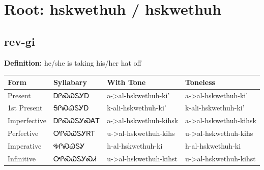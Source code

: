 \documentclass{article}%
\begin{document}
%
\normalsize%
\section*{Root: hskwethuh / hskwethuh}%
\subsection*{rev-gi}%
\textbf{Definition: }%
he/she is taking his/her hat off%
\\[0.5em]%
\begin{tabular}{|l|l|l|l|}%
\hline%
\textbf{Form}&\textbf{Syllabary}&\textbf{With Tone}&\textbf{Toneless}\\%
\hline%
Present&ᎠᎵᏍᏇᏚᎩᎠ&a{-}>al{-}hskwethuh{-}ki'&a{-}>al{-}hskwethuh{-}ki'\\%
1st Present&ᎦᎵᏍᏇᏚᎩᎠ&k{-}ali{-}hskwethuh{-}ki'&k{-}ali{-}hskwethuh{-}ki'\\%
Imperfective&ᎠᎵᏍᏇᏚᎩᏍᎪᎢ&a{-}>al{-}hskwethuh{-}kihsk&a{-}>al{-}hskwethuh{-}kihsk\\%
Perfective&ᎤᎵᏍᏇᏚᎩᏒᎢ&u{-}>al{-}hskwethuh{-}kihs&u{-}>al{-}hskwethuh{-}kihs\\%
Imperative&ᎭᎵᏍᏇᏚᎩ&h{-}al{-}hskwethuh{-}ki&h{-}al{-}hskwethuh{-}ki\\%
Infinitive&ᎤᎵᏍᏇᏚᎩᏍᏗ&u{-}>al{-}hskwethuh{-}kihst&u{-}>al{-}hskwethuh{-}kihst\\%
\hline%
\end{tabular}%
\\[1em]%
\end{document}
